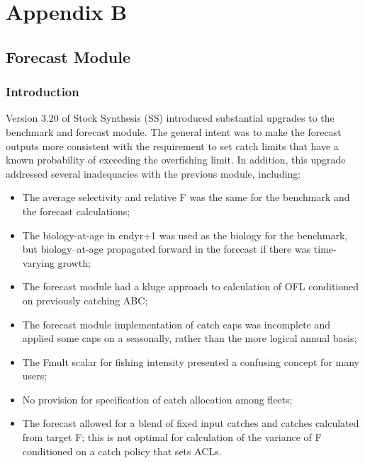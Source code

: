 \section{Appendix B}
\subsection{Forecast Module}

\subsubsection{Introduction}
Version 3.20 of Stock Synthesis (SS) introduced substantial upgrades to the benchmark and forecast module.  The general intent was to make the forecast outputs more consistent with the requirement to set catch limits that have a known probability of exceeding the overfishing limit.  In addition, this upgrade addressed several inadequacies with the previous module, including:

\begin{itemize}
	\item The average selectivity and relative F was the same for the benchmark and the forecast calculations;
	\item The biology-at-age in endyr+1 was used as the biology for the benchmark, but biology–at-age propagated forward in the forecast if there was time-varying growth;
	\item The forecast module had a kluge approach to calculation of OFL conditioned on previously catching ABC;
	\item The forecast module implementation of catch caps was incomplete and applied some caps on a seasonally, rather than the more logical annual basis;
	\item The Fmult scalar for fishing intensity presented a confusing concept for many users;
	\item No provision for specification of catch allocation among fleets;
	\item The forecast allowed for a blend of fixed input catches and catches calculated from target F; this is not optimal for calculation of the variance of F conditioned on a catch policy that sets ACLs.
\end{itemize}

